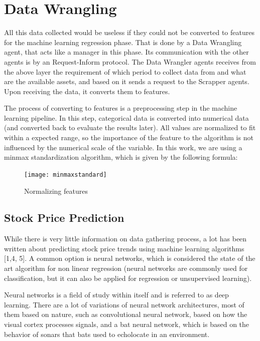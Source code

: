 \documentclass[prodmode,acmtecs]{acmsmall} %
\begin{document}
\section {Data Wrangling}

All this data collected would be useless if they could not be converted to features for the machine learning regression phase. That is done by a Data Wrangling agent, that acts like a manager in this phase. Its communication with the other agents is by an Request-Inform protocol. The Data Wrangler agents receives from the above layer the requirement of which period to collect data from and what are the available assets, and based on it sends a request to the Scrapper agents. Upon receiving the data, it converts them to features.

The process of converting to features is a preprocessing step in the machine learning pipeline. In this step, categorical data is converted into numerical data (and converted back to evaluate the results later). All values are normalized to fit within a expected range, so the importance of the feature to the algorithm is not influenced by the numerical scale of the variable. In this work, we are using a minmax standardization algorithm, which is given by the following formula:	 

\begin{figure}
	\centering
	\texttt{[image: minmaxstandard]}
	\caption{Normalizing features}
	\label{fig:four}	
\end{figure}

\subsection {Stock Price Prediction}

While there is very little information on data gathering process, a lot has been written about predicting stock price trends using machine learning algorithms [1,4, 5]. A common option is neural networks, which is considered the state of the art algorithm for non linear regression (neural networks are commonly used for classification, but it can also be applied for regression or unsupervised learning). 

Neural networks is a field of study within itself and is referred to as deep learning. There are a lot of variations of neural network architectures, most of them based on nature, such as convolutional neural network, based on how the visual cortex processes signals, and a bat neural network, which is based on the behavior of sonars that bats used to echolocate in an environment.
\end{document}

